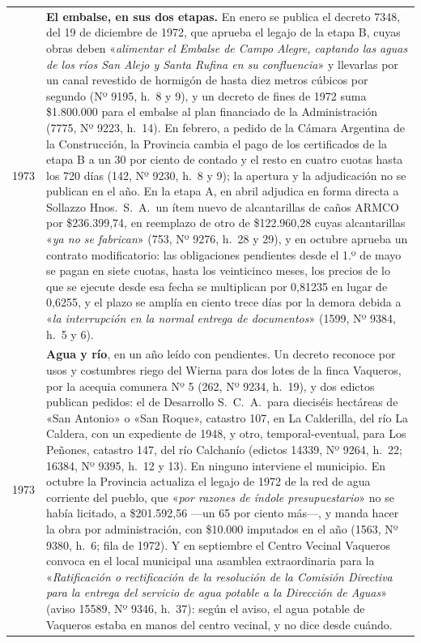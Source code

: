 \begin{longtable}{@{}p{2.7cm}p{10.3cm}@{}}
1973 & \textbf{El embalse, en sus dos etapas.} En enero se publica el decreto 7348, del 19 de diciembre de 1972, que aprueba el legajo de la etapa B, cuyas obras deben «\textit{alimentar el Embalse de Campo Alegre, captando las aguas de los ríos San Alejo y Santa Rufina en su confluencia}» y llevarlas por un canal revestido de hormigón de hasta diez metros cúbicos por segundo (Nº 9195, h.\ 8 y 9), y un decreto de fines de 1972 suma \$1.800.000 para el embalse al plan financiado de la Administración (7775, Nº 9223, h.\ 14). En febrero, a pedido de la Cámara Argentina de la Construcción, la Provincia cambia el pago de los certificados de la etapa B a un 30 por ciento de contado y el resto en cuatro cuotas hasta los 720 días (142, Nº 9230, h.\ 8 y 9); la apertura y la adjudicación no se publican en el año. En la etapa A, en abril adjudica en forma directa a Sollazzo Hnos.\ S.\ A.\ un ítem nuevo de alcantarillas de caños ARMCO por \$236.399,74, en reemplazo de otro de \$122.960,28 cuyas alcantarillas «\textit{ya no se fabrican}» (753, Nº 9276, h.\ 28 y 29), y en octubre aprueba un contrato modificatorio: las obligaciones pendientes desde el 1.º de mayo se pagan en siete cuotas, hasta los veinticinco meses, los precios de lo que se ejecute desde esa fecha se multiplican por 0,81235 en lugar de 0,6255, y el plazo se amplía en ciento trece días por la demora debida a «\textit{la interrupción en la normal entrega de documentos}» (1599, Nº 9384, h.\ 5 y 6). \\
1973 & \textbf{Agua y río}, en un año leído con pendientes. Un decreto reconoce por usos y costumbres riego del Wierna para dos lotes de la finca Vaqueros, por la acequia comunera Nº 5 (262, Nº 9234, h.\ 19), y dos edictos publican pedidos: el de Desarrollo S.\ C.\ A.\ para dieciséis hectáreas de «San Antonio» o «San Roque», catastro 107, en La Calderilla, del río La Caldera, con un expediente de 1948, y otro, temporal-eventual, para Los Peñones, catastro 147, del río Calchanío (edictos 14339, Nº 9264, h.\ 22; 16384, Nº 9395, h.\ 12 y 13). En ninguno interviene el municipio. En octubre la Provincia actualiza el legajo de 1972 de la red de agua corriente del pueblo, que «\textit{por razones de índole presupuestario}» no se había licitado, a \$201.592,56 ---un 65 por ciento más---, y manda hacer la obra por administración, con \$10.000 imputados en el año (1563, Nº 9380, h.\ 6; fila de 1972). Y en septiembre el Centro Vecinal Vaqueros convoca en el local municipal una asamblea extraordinaria para la «\textit{Ratificación o rectificación de la resolución de la Comisión Directiva para la entrega del servicio de agua potable a la Dirección de Aguas}» (aviso 15589, Nº 9346, h.\ 37): según el aviso, el agua potable de Vaqueros estaba en manos del centro vecinal, y no dice desde cuándo. \\

\end{longtable}
